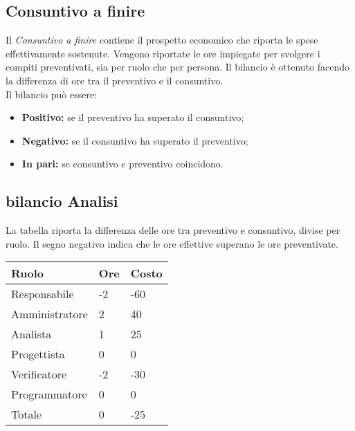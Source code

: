 \begin{flushleft}
    \chapter{Consuntivo a finire}
    Il \textit{Consuntivo a finire} contiene il prospetto economico che riporta le spese effettivamente sostenute. Vengono riportate le ore impiegate per svolgere i compiti preventivati, sia per
    ruolo che per persona. Il bilancio è ottenuto facendo la differenza di ore tra il preventivo e il consuntivo.\\
    Il bilancio può essere:
    \begin{itemize}
        \item \textbf{Positivo:} se il preventivo ha superato il consuntivo;
        \item \textbf{Negativo:} se il consuntivo ha superato il preventivo;
        \item \textbf{In pari:} se consuntivo e preventivo coincidono.
    \end{itemize}
    \section{bilancio Analisi}
    La tabella riporta la differenza delle ore tra preventivo e consuntivo, divise per ruolo. Il segno negativo indica che le ore effettive superano le ore preventivate.    
    \begin{table}[h]
        \begin{tabular}{|l|l|l|}
        \hline
        Ruolo          & Ore & Costo \\ \hline
        Responsabile   & -2  & -60   \\ \hline
        Amministratore & 2   & 40    \\ \hline
        Analista       & 1   & 25    \\ \hline
        Progettista    & 0   & 0     \\ \hline
        Verificatore   & -2  & -30   \\ \hline
        Programmatore  & 0   & 0     \\ \hline
        Totale         & 0   & -25   \\ \hline
        \end{tabular}
    \end{table}\\


\end{flushleft}
